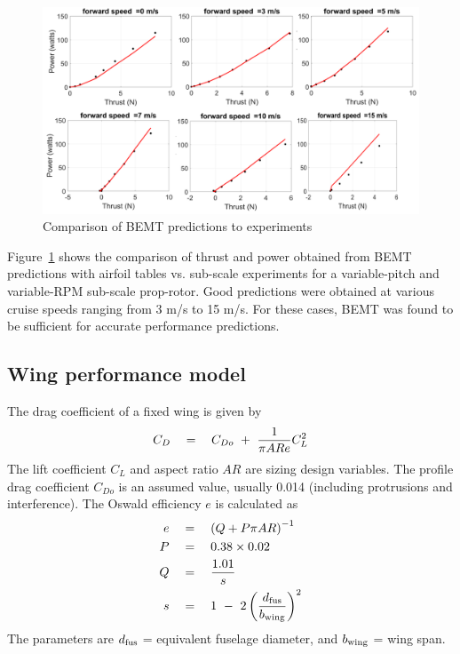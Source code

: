 
\begin{figure}
\centering    
\includegraphics[width=\textwidth]{images/bemt_validation.png}
\vspace{-1cm}
\caption{Comparison of BEMT predictions to experiments}
\label{fig:bemt}
\end{figure}

Figure~\ref{fig:bemt} shows the comparison of thrust and power obtained from BEMT predictions with airfoil tables vs. sub-scale experiments for a variable-pitch and variable-RPM sub-scale prop-rotor. Good predictions were obtained at various cruise speeds ranging from 3 m/s to 15 m/s. For these cases, BEMT was found to be sufficient for accurate performance predictions. %

\subsection{Wing performance model}
The drag coefficient of a fixed wing is given by 
\begin{equation}
C_D \quad = \quad C_{Do} \textrm{ } + \textrm{ } \frac{1}{\pi AR e} C_L^2 
\end{equation}
The lift coefficient $C_L$ and aspect ratio $AR$ are sizing design variables. The profile drag coefficient $C_{Do}$ is an assumed value, usually 0.014 (including protrusions and interference). The Oswald efficiency $e$ is calculated as %
\begin{align*}
e \quad &= \quad \left(Q + P \pi AR \right)^{-1}  \\
P \quad &= \quad 0.38 \times 0.02 \\
Q \quad &= \quad \frac{1.01}{s} \\ 
s \quad &= \quad 1 \textrm{ } - \textrm{ } 2 \left(\frac{d_{\rm fus}}{b_{\rm wing}}\right)^2
\end{align*}
The parameters are $d_{\rm fus}$ = equivalent fuselage diameter, and $b_{\rm wing}$ = wing span.
\pagebreak
